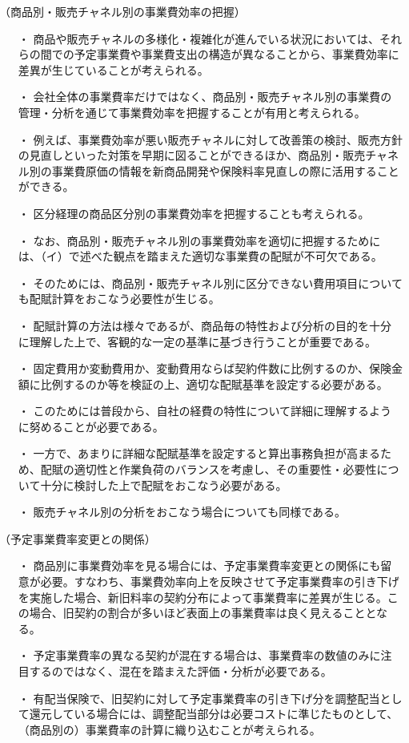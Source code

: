 \documentclass[report,gutter=10mm,fore-edge=10mm,uplatex,dvipdfmx]{jlreq}
\begin{document}
（商品別・販売チャネル別の事業費効率の把握）
\begin{itemize}
 \item [・]  商品や販売チャネルの多様化・複雑化が進んでいる状況においては、それらの間での予定事業費や事業費支出の構造が異なることから、事業費効率に差異が生じていることが考えられる。
 \item [・]  会社全体の事業費率だけではなく、商品別・販売チャネル別の事業費の管理・分析を通じて事業費効率を把握することが有用と考えられる。
 \item [・]  例えば、事業費効率が悪い販売チャネルに対して改善策の検討、販売方針の見直しといった対策を早期に図ることができるほか、商品別・販売チャネル別の事業費原価の情報を新商品開発や保険料率見直しの際に活用することができる。
 \item [・]  区分経理の商品区分別の事業費効率を把握することも考えられる。
 \item [・]  なお、商品別・販売チャネル別の事業費効率を適切に把握するためには、（イ）で述べた観点を踏まえた適切な事業費の配賦が不可欠である。
 \item [・]  そのためには、商品別・販売チャネル別に区分できない費用項目についても配賦計算をおこなう必要性が生じる。
 \item [・]  配賦計算の方法は様々であるが、商品毎の特性および分析の目的を十分に理解した上で、客観的な一定の基準に基づき行うことが重要である。
 \item [・]  固定費用か変動費用か、変動費用ならば契約件数に比例するのか、保険金額に比例するのか等を検証の上、適切な配賦基準を設定する必要がある。
 \item [・]  このためには普段から、自社の経費の特性について詳細に理解するように努めることが必要である。
 \item [・]  一方で、あまりに詳細な配賦基準を設定すると算出事務負担が高まるため、配賦の適切性と作業負荷のバランスを考慮し、その重要性・必要性について十分に検討した上で配賦をおこなう必要がある。
 \item [・]  販売チャネル別の分析をおこなう場合についても同様である。
\end{itemize}

（予定事業費率変更との関係）
\begin{itemize}
 \item [・]  商品別に事業費効率を見る場合には、予定事業費率変更との関係にも留意が必要。すなわち、事業費効率向上を反映させて予定事業費率の引き下げを実施した場合、新旧料率の契約分布によって事業費率に差異が生じる。この場合、旧契約の割合が多いほど表面上の事業費率は良く見えることとなる。
 \item [・]  予定事業費率の異なる契約が混在する場合は、事業費率の数値のみに注目するのではなく、混在を踏まえた評価・分析が必要である。
 \item [・]  有配当保険で、旧契約に対して予定事業費率の引き下げ分を調整配当として還元している場合には、調整配当部分は必要コストに準じたものとして、（商品別の）事業費率の計算に織り込むことが考えられる。
\end{itemize}
\end{document}
